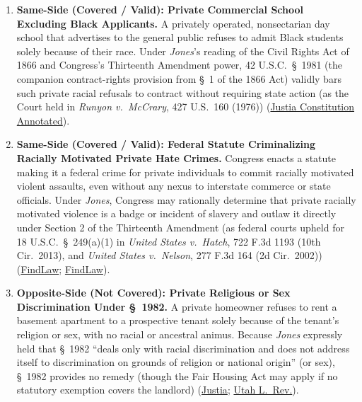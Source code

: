 \documentclass[12pt]{article}
\begin{document}
\begin{enumerate}
\item \textbf{Same-Side (Covered / Valid): Private Commercial School Excluding Black Applicants.} A privately operated, nonsectarian day school that advertises to the general public refuses to admit Black students solely because of their race. Under \textit{Jones}'s reading of the Civil Rights Act of 1866 and Congress's Thirteenth Amendment power, 42 U.S.C.\ \S~1981 (the companion contract-rights provision from \S~1 of the 1866 Act) validly bars such private racial refusals to contract without requiring state action (as the Court held in \textit{Runyon v.\ McCrary}, 427 U.S.\ 160 (1976)) (\href{https://law.justia.com/constitution/us/amendment-13/01-abolition-of-slavery.html}{Justia Constitution Annotated}).

\item \textbf{Same-Side (Covered / Valid): Federal Statute Criminalizing Racially Motivated Private Hate Crimes.} Congress enacts a statute making it a federal crime for private individuals to commit racially motivated violent assaults, even without any nexus to interstate commerce or state officials. Under \textit{Jones}, Congress may rationally determine that private racially motivated violence is a badge or incident of slavery and outlaw it directly under Section 2 of the Thirteenth Amendment (as federal courts upheld for 18 U.S.C.\ \S~249(a)(1) in \textit{United States v.\ Hatch}, 722 F.3d 1193 (10th Cir.\ 2013), and \textit{United States v.\ Nelson}, 277 F.3d 164 (2d Cir.\ 2002)) (\href{https://caselaw.findlaw.com/court/us-10th-circuit/1637502.html}{FindLaw}; \href{https://caselaw.findlaw.com/court/us-2nd-circuit/1333018.html}{FindLaw}).

\item \textbf{Opposite-Side (Not Covered): Private Religious or Sex Discrimination Under \S~1982.} A private homeowner refuses to rent a basement apartment to a prospective tenant solely because of the tenant's religion or sex, with no racial or ancestral animus. Because \textit{Jones} expressly held that \S~1982 ``deals only with racial discrimination and does not address itself to discrimination on grounds of religion or national origin'' (or sex), \S~1982 provides no remedy (though the Fair Housing Act may apply if no statutory exemption covers the landlord) (\href{https://supreme.justia.com/cases/federal/us/392/409/}{Justia}; \href{https://dc.law.utah.edu/cgi/viewcontent.cgi?article=2245&context=ulr}{Utah L.\ Rev.}).


\end{enumerate}
\end{document}
